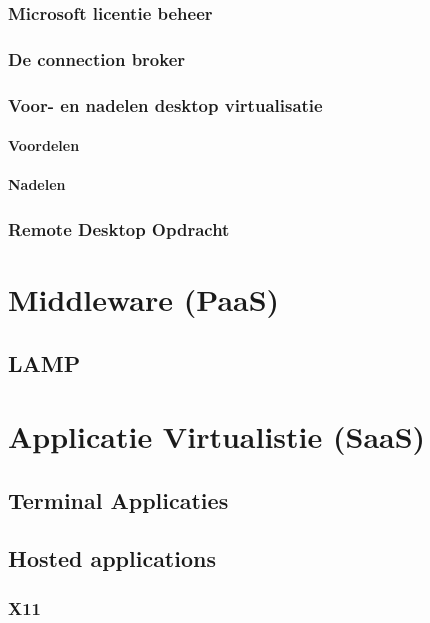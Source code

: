\documentclass[a4paper,12pt,twoside,openright,titlepage]{book}
\begin{document}
\subsection{Microsoft licentie beheer}

\subsection{De connection broker}

\subsection{Voor- en nadelen desktop virtualisatie}
\subsubsection{Voordelen}

\subsubsection{Nadelen}

\subsection{Remote Desktop Opdracht}


\chapter{Middleware (PaaS)}
\section{LAMP}


\chapter{Applicatie Virtualistie (SaaS)}

\section{Terminal Applicaties}

\section{Hosted applications}

\subsection{X11}

\end{document}
